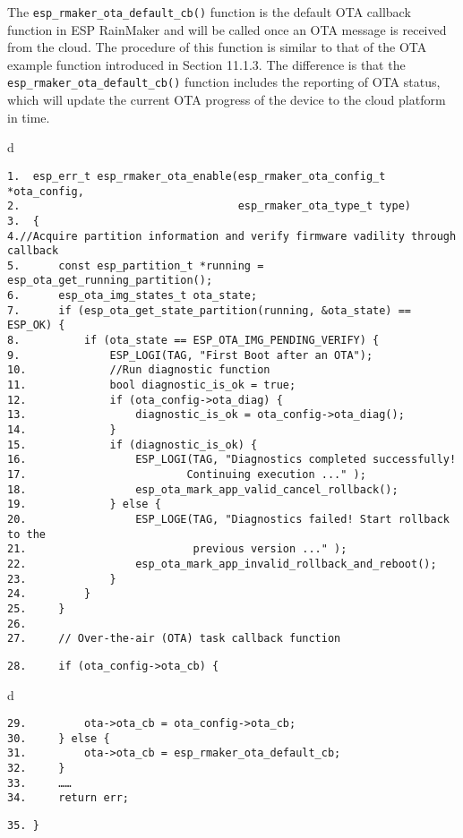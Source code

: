 \documentclass[a4paper,12pt]{book}
\begin{document}
The \verb|esp_rmaker_ota_default_cb()| function is the default OTA callback function in ESP RainMaker and will be called once an OTA message is received from the cloud. The procedure of this function is similar to that of the OTA example function introduced in Section 11.1.3. The difference is that the \verb|esp_rmaker_ota_default_cb()| function includes the reporting of OTA status, which will update the current OTA progress of the device to the cloud platform in time.

\begin{codebloc}
\begin{tabular}{d}
\vspace{2pt}
\begin{verbatim}
1.  esp_err_t esp_rmaker_ota_enable(esp_rmaker_ota_config_t *ota_config,
2.                                  esp_rmaker_ota_type_t type)
3.  {
4.//Acquire partition information and verify firmware vadility through callback
5.      const esp_partition_t *running = esp_ota_get_running_partition();
6.      esp_ota_img_states_t ota_state;
7.      if (esp_ota_get_state_partition(running, &ota_state) == ESP_OK) {
8.          if (ota_state == ESP_OTA_IMG_PENDING_VERIFY) {
9.              ESP_LOGI(TAG, "First Boot after an OTA");
10.             //Run diagnostic function
11.             bool diagnostic_is_ok = true;
12.             if (ota_config->ota_diag) {
13.                 diagnostic_is_ok = ota_config->ota_diag();
14.             }
15.             if (diagnostic_is_ok) {
16.                 ESP_LOGI(TAG, "Diagnostics completed successfully!
17.                         Continuing execution ..." );
18.                 esp_ota_mark_app_valid_cancel_rollback();
19.             } else {
20.                 ESP_LOGE(TAG, "Diagnostics failed! Start rollback to the
21.                          previous version ..." );
22.                 esp_ota_mark_app_invalid_rollback_and_reboot();
23.             }
24.         }
25.     }
26.
27.     // Over-the-air (OTA) task callback function
\end{verbatim}
\verb|28.     if (ota_config->ota_cb) {|
\end{tabular}
\end{codebloc}

\begin{codebloc}
\begin{tabular}{d}
\vspace{2pt}
\begin{verbatim}
29.         ota->ota_cb = ota_config->ota_cb;
30.     } else {
31.         ota->ota_cb = esp_rmaker_ota_default_cb;
32.     }
33.     ……
34.     return err;
\end{verbatim}
\verb|35. }|
\end{tabular}
\end{codebloc}
\end{document}
